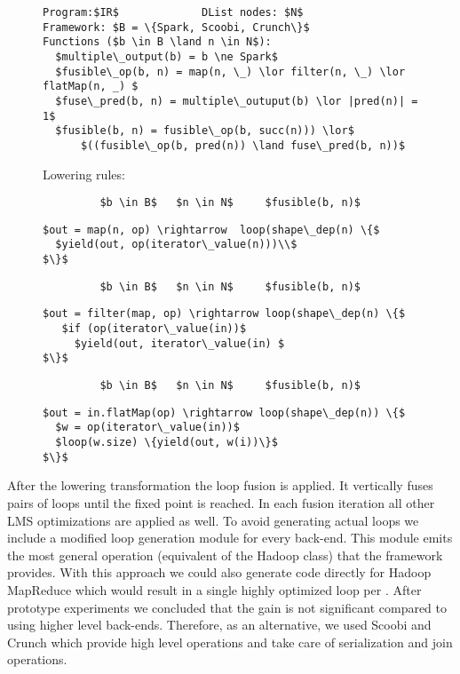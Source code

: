 \begin{figure}
\begin{lstlisting}
Program:$IR$             DList nodes: $N$  
Framework: $B = \{Spark, Scoobi, Crunch\}$ 
Functions ($b \in B \land n \in N$): 
  $multiple\_output(b) = b \ne Spark$
  $fusible\_op(b, n) = map(n, \_) \lor filter(n, \_) \lor flatMap(n, _) $
  $fuse\_pred(b, n) = multiple\_outuput(b) \lor |pred(n)| = 1$ 
  $fusible(b, n) = fusible\_op(b, succ(n))) \lor$
      $((fusible\_op(b, pred(n)) \land fuse\_pred(b, n))$
\end{lstlisting}


Lowering rules:
\begin{lstlisting}
         $b \in B$   $n \in N$     $fusible(b, n)$
\end{lstlisting} 
\vspace{-5pt}{\hspace{0mm}\rule{0.99\columnwidth}{0.25pt}}
\begin{lstlisting}
$out = map(n, op) \rightarrow  loop(shape\_dep(n) \{$
  $yield(out, op(iterator\_value(n)))\\$
$\}$
\end{lstlisting} 
\begin{lstlisting}
         $b \in B$   $n \in N$     $fusible(b, n)$
\end{lstlisting} 
\vspace{-5pt}{\hspace{0mm}\rule{0.99\columnwidth}{0.25pt}}
\begin{lstlisting}
$out = filter(map, op) \rightarrow loop(shape\_dep(n) \{$
   $if (op(iterator\_value(in))$
     $yield(out, iterator\_value(in) $
$\}$
\end{lstlisting}
\begin{lstlisting}
         $b \in B$   $n \in N$     $fusible(b, n)$
\end{lstlisting} 
\vspace{-5pt}{\hspace{0mm}\rule{0.99\columnwidth}{0.25pt}}
\begin{lstlisting}
$out = in.flatMap(op) \rightarrow loop(shape\_dep(n)) \{$
  $w = op(iterator\_value(in))$
  $loop(w.size) \{yield(out, w(i))\}$
$\}$
\end{lstlisting}
\end{figure}


After the lowering transformation the loop fusion is applied. It vertically fuses pairs of loops until the fixed point is reached. In each fusion iteration all other LMS optimizations are applied as well. To avoid generating actual  loops we include a modified loop generation module for every back-end. This module emits the most general operation (equivalent of the Hadoop  class) that the framework provides. With this approach we could also generate code directly for Hadoop MapReduce which would result in a single highly optimized loop per . After prototype experiments we concluded that the gain is not significant compared to using higher level back-ends. Therefore, as an alternative, we used Scoobi and Crunch which provide high level operations and take care of serialization and join operations.    

